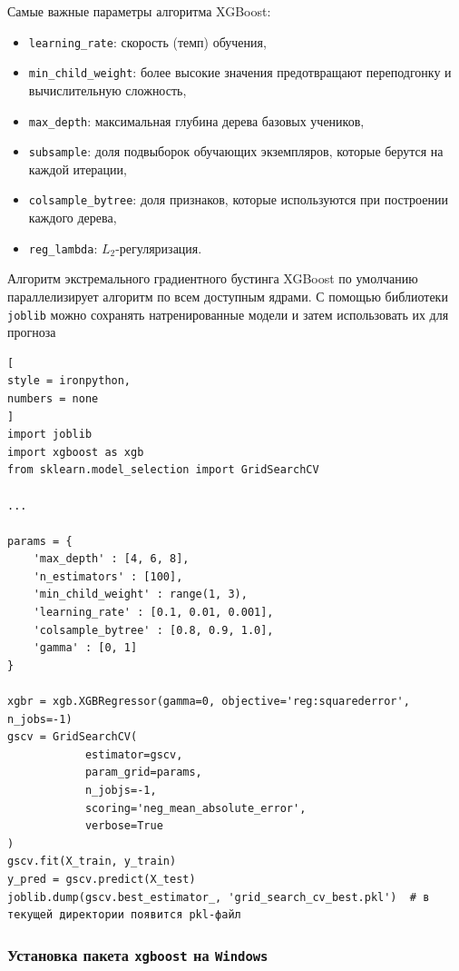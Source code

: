 \documentclass[%
	11pt,
	a4paper,
	utf8,
		]{article}
\begin{document}
Самые важные параметры алгоритма XGBoost:
\begin{itemize}
	\item \texttt{learning\_rate}: скорость (темп) обучения, 
	
	\item \texttt{min\_child\_weight}: более высокие значения предотвращают переподгонку и вычислительную сложность,
	
	\item \texttt{max\_depth}: максимальная глубина дерева базовых учеников,
	
	\item \texttt{subsample}: доля подвыборок обучающих экземпляров, которые берутся на каждой итерации,
	
	\item \texttt{colsample\_bytree}: доля признаков, которые используются при построении каждого дерева,
	
	\item \texttt{reg\_lambda}: $ L_2 $-регуляризация.
\end{itemize}

Алгоритм экстремального градиентного бустинга XGBoost по умолчанию параллелизирует алгоритм по всем доступным ядрами. С помощью библиотеки \texttt{joblib} можно сохранять натренированные модели и затем использовать их для прогноза
\begin{lstlisting}[
style = ironpython,
numbers = none
]
import joblib
import xgboost as xgb
from sklearn.model_selection import GridSearchCV

...

params = {
    'max_depth' : [4, 6, 8],
    'n_estimators' : [100],
    'min_child_weight' : range(1, 3),
    'learning_rate' : [0.1, 0.01, 0.001],
    'colsample_bytree' : [0.8, 0.9, 1.0],
    'gamma' : [0, 1]
}

xgbr = xgb.XGBRegressor(gamma=0, objective='reg:squarederror', n_jobs=-1)
gscv = GridSearchCV(
            estimator=gscv,
            param_grid=params,
            n_jobjs=-1,
            scoring='neg_mean_absolute_error',
            verbose=True
)
gscv.fit(X_train, y_train)
y_pred = gscv.predict(X_test)
joblib.dump(gscv.best_estimator_, 'grid_search_cv_best.pkl')  # в текущей директории появится pkl-файл
\end{lstlisting}



\subsubsection{Установка пакета \texttt{xgboost} на \texttt{Windows}}
\end{document}

